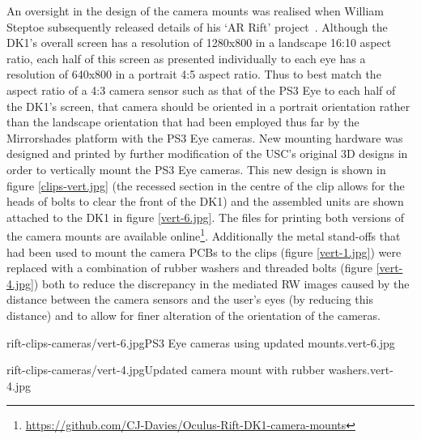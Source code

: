 An oversight in the design of the camera mounts was realised when William Steptoe subsequently released details of his `AR Rift' project~\cite{Steptoe2014}. Although the DK1's overall screen has a resolution of 1280x800 in a landscape 16:10 aspect ratio, each half of this screen as presented individually to each eye has a resolution of 640x800 in a portrait 4:5 aspect ratio. Thus to best match the aspect ratio of a 4:3 camera sensor such as that of the PS3 Eye to each half of the DK1's screen, that camera should be oriented in a portrait orientation rather than the landscape orientation that had been employed thus far by the Mirrorshades platform with the PS3 Eye cameras. New mounting hardware was designed and printed by further modification of the USC's original 3D designs in order to vertically mount the PS3 Eye cameras. This new design is shown in figure \ref{clips-vert.jpg} (the recessed section in the centre of the clip allows for the heads of bolts to clear the front of the DK1) and the assembled units are shown attached to the DK1 in figure \ref{vert-6.jpg}. The files for printing both versions of the camera mounts are available online\footnote{\url{https://github.com/CJ-Davies/Oculus-Rift-DK1-camera-mounts}}. Additionally the metal stand-offs that had been used to mount the camera PCBs to the clips (figure \ref{vert-1.jpg}) were replaced with a combination of rubber washers and threaded bolts (figure \ref{vert-4.jpg}) both to reduce the discrepancy in the mediated RW images caused by the distance between the camera sensors and the user's eyes (by reducing this distance) and to allow for finer alteration of the orientation of the cameras.

       {rift-clips-cameras/vert-6.jpg}{PS3 Eye cameras using updated mounts.}{vert-6.jpg}

       {rift-clips-cameras/vert-4.jpg}{Updated camera mount with rubber washers.}{vert-4.jpg}

